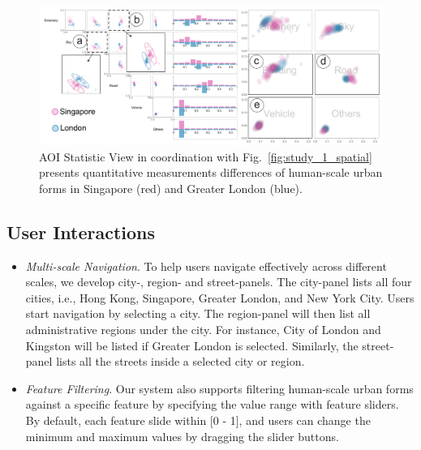 \begin{figure}[t]
	\centering
	\includegraphics[width=\columnwidth]{figure/streetvizor/fig8_study_1/study_1_statistic}
	\vspace{-7mm}
	\caption{AOI Statistic View in coordination with Fig.~\ref{fig:study_1_spatial} presents quantitative measurements differences of human-scale urban forms in Singapore (red) and Greater London (blue).}
	\label{fig:study_1_statistic}
	\vspace{-5mm}
\end{figure}


\subsection{User Interactions}
\label{ssec:user_interaction}


\begin{itemize}

\vspace*{-1mm}
\item
\textit{Multi-scale Navigation}.
To help users navigate effectively across different scales, we develop city-, region- and street-panels.
The city-panel lists all four cities, i.e., Hong Kong, Singapore, Greater London, and New York City.
Users start navigation by selecting a city. 
The region-panel will then list all administrative regions under the city.
For instance, City of London and Kingston will be listed if Greater London is selected.
Similarly, the street-panel lists all the streets inside a selected city or region.

\vspace*{-1mm}
\item
\textit{Feature Filtering}.
Our system also supports filtering human-scale urban forms against a specific feature by specifying the value range with feature sliders. 
By default, each feature slide within [0 - 1], and users can change the minimum and maximum values by dragging the slider buttons.

\end{itemize}

